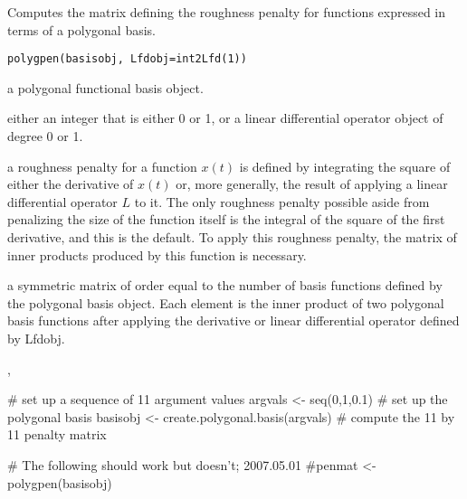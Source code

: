 \begin{Description}\relax
Computes the matrix defining the roughness penalty for functions
expressed in terms of a polygonal basis.
\end{Description}
\begin{Usage}
\begin{verbatim}
polygpen(basisobj, Lfdobj=int2Lfd(1))
\end{verbatim}
\end{Usage}
\begin{Arguments}
\begin{ldescription}
\item[\code{basisobj}] a polygonal functional basis object.

\item[\code{Lfdobj}] either an integer that is either 0 or 1, or a
linear differential operator object of degree 0 or 1.

\end{ldescription}
\end{Arguments}
\begin{Details}\relax
a roughness penalty for a function $ x(t) $ is defined by
integrating the square of either the derivative of  $ x(t) $ or,
more generally, the result of applying a linear differential operator
$ L $ to it.  The only roughness penalty possible aside from
penalizing the size of the function itself is the integral
of the square of the first derivative, and
this is the default. To apply this roughness penalty, the matrix of
inner products produced by this function is necessary.
\end{Details}
\begin{Value}
a symmetric matrix of order equal to the number of basis functions
defined by the polygonal basis object.  Each element is the inner product
of two polygonal basis functions after applying the derivative or linear
differential operator defined by Lfdobj.
\end{Value}
\begin{SeeAlso}\relax
{}, 
\end{SeeAlso}
\begin{Examples}
\begin{ExampleCode}

#  set up a sequence of 11 argument values
argvals <- seq(0,1,0.1)
#  set up the polygonal basis
basisobj <- create.polygonal.basis(argvals)
#  compute the 11 by 11 penalty matrix

# The following should work but doesn't;  2007.05.01
#penmat <- polygpen(basisobj)

\end{ExampleCode}
\end{Examples}

